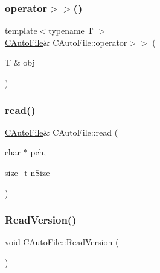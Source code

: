 \mbox{\label{class_c_auto_file_ae6826219322626d2ac8229e022c41dd7}} 
\subsubsection{\texorpdfstring{operator$>$$>$()}{operator>>()}}
{\footnotesize\ttfamily template$<$typename T $>$ \\
\mbox{\hyperlink{class_c_auto_file}{C\+Auto\+File}}\& C\+Auto\+File\+::operator$>$$>$ (\begin{DoxyParamCaption}\item[{T \&}]{obj }\end{DoxyParamCaption})\hspace{0.3cm}{\ttfamily [inline]}}

\mbox{\label{class_c_auto_file_a87e670f3dd03055264c05b25335babb4}} 
\subsubsection{\texorpdfstring{read()}{read()}}
{\footnotesize\ttfamily \mbox{\hyperlink{class_c_auto_file}{C\+Auto\+File}}\& C\+Auto\+File\+::read (\begin{DoxyParamCaption}\item[{char $\ast$}]{pch,  }\item[{size\+\_\+t}]{n\+Size }\end{DoxyParamCaption})\hspace{0.3cm}{\ttfamily [inline]}}

\mbox{\label{class_c_auto_file_a9511060b5c971cff532faeab60c7d88b}} 
\subsubsection{\texorpdfstring{Read\+Version()}{ReadVersion()}}
{\footnotesize\ttfamily void C\+Auto\+File\+::\+Read\+Version (\begin{DoxyParamCaption}{ }\end{DoxyParamCaption})\hspace{0.3cm}{\ttfamily [inline]}}

